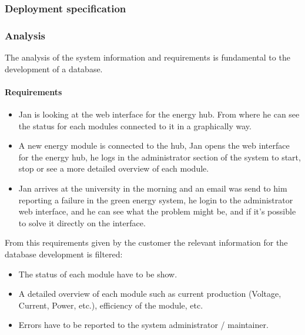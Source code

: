 \subsubsection{Deployment specification}

%	
\subsubsection{Analysis}
The analysis of the system information and requirements is fundamental to the development of a database. 
\paragraph{Requirements}
	\begin{itemize}
		\item Jan is looking at the web interface for the energy hub. From where he can see the status for each modules connected to it
in a graphically way.
		\item A new energy module is connected to the hub, Jan opens the web interface for the energy hub, he logs in the administrator section of the system
to start, stop or see a more detailed overview of each module.
		\item Jan arrives at the university in the morning and an email was send to him reporting a failure in the green energy system, he login to the administrator web interface, and he can see what the problem might be, and if it's possible to solve it directly on the interface.
	\end{itemize}

From this requirements given by the customer the relevant information for the database development is filtered:
	\begin{itemize}
		\item The status of each module have to be show.
		\item A detailed overview of each module such as current production (Voltage, Current, Power, etc.), efficiency of the module, etc.
		\item Errors have to be reported to the system administrator / maintainer.
	\end{itemize}
	
